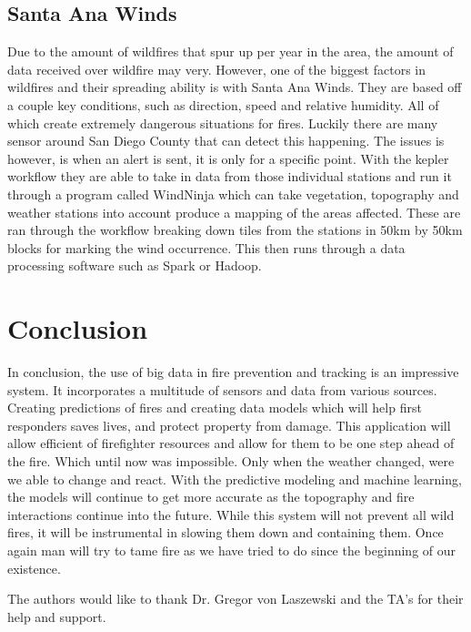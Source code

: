 \documentclass[sigconf]{acmart}
\begin{document}
\subsection{Santa Ana Winds}
Due to the amount of wildfires that spur up per year in the area, the 
amount of data received over wildfire may very.   However, one of the 
biggest factors in wildfires and their spreading ability is with Santa 
Ana Winds.  They are based off a couple key conditions, such as 
direction, speed and  relative humidity.  All of which create extremely 
dangerous situations for fires.  Luckily there are many sensor around 
San Diego County that can detect this happening.  The issues is 
however, is when an alert is sent, it is only for a specific point.  
With the kepler workflow they are able to take in data from those 
individual stations and run it through a program called WindNinja which 
can take vegetation, topography and weather stations into account 
produce a mapping of the areas affected.  These are ran through the 
workflow breaking down tiles from the stations in 50km by 50km blocks 
for marking the wind occurrence.  This then runs through a data 
processing software such as Spark or Hadoop.

 
\section{Conclusion}
In conclusion, the use of big data in fire prevention and tracking is 
an impressive system.  It incorporates a multitude of sensors and data
from various sources.  Creating predictions of fires and creating data 
models which will help first responders saves lives, and protect 
property from damage.  This application will allow efficient of 
firefighter resources and allow for them to be one step ahead of the 
fire.  Which until now was impossible.  Only when the weather changed, 
were we able to change and react.   With the predictive modeling and 
machine learning, the models will continue to get more accurate as the 
topography and fire interactions continue into the future.  While this 
system will not prevent all wild fires, it will be instrumental in 
slowing them down and containing them.  Once again man will try to tame fire as we have tried to do since the beginning of our existence. 
\begin{acks}
The authors would like to thank Dr. Gregor von Laszewski and the TA's for their help and support.
\end{acks}


\end{document}
